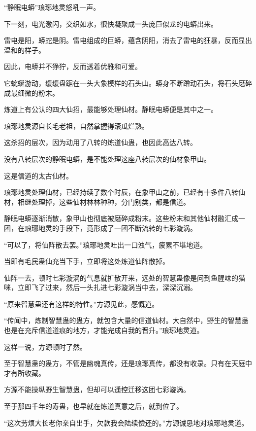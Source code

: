 
\begin{this_body}

“静眠电蟒”琅琊地灵怒吼一声。

下一刻，电光激闪，交织如水，很快凝聚成一头庞巨似龙的电蟒出来。

雷电是阳，蟒蛇是阴。雷电组成的巨蟒，蕴含阴阳，消去了雷电的狂暴，反而显出温和的样子。

因此，电蟒并不狰狞，反而透着优雅和可爱。

它蜿蜒游动，缓缓盘踞在一头大象模样的石头山。蟒身不断蹭动石头，将石头磨碎成最细微的粉末。

炼道上有公认的四大仙招，最能够处理仙材。静眠电蟒便是其中之一。

琅琊地灵源自长毛老祖，自然掌握得滚瓜烂熟。

这杀招的层次，因为动用了八转的炼道仙蛊，也因此高达八转。

没有八转层次的静眠电蟒，是不能处理这座八转层次的仙材象甲山。

这是信道的太古仙材。

琅琊地灵处理仙材，已经持续了数个时辰，在象甲山之前，已经有十多件八转仙材，相继处理掉，这些仙材林林种种，分门别类，都是信道。

静眠电蟒逐渐消散，象甲山也彻底被磨碎成粉末。这些粉末和其他仙材融汇成一团，在琅琊地灵的手段下，竟形成了一团不断流转的七彩漩涡。

“可以了，将仙阵散去罢。”琅琊地灵吐出一口浊气，疲累不堪地道。

当即有毛民蛊仙充当下手，立即将这处炼道仙阵散掉。

仙阵一去，顿时七彩漩涡的气息就扩散开来，远处的智慧蛊像是问到鱼腥味的猫咪，立即飞了过来，然后一头扎进七彩漩涡当中去，深深沉溺。

“原来智慧蛊还有这样的特性。”方源见此，感慨道。

“传闻中，炼制智慧蛊的蛊方，就包含大量的信道仙材。大自然中，野生的智慧蛊也是在充斥信道道痕的地方，才能完成自我的晋升。”琅琊地灵道。

这样一说，方源顿时了然。

至于智慧蛊的蛊方，不管是幽魂真传，还是琅琊真传，都没有收录。只有在天庭中才有所收藏。

方源不能操纵野生智慧蛊，但却可以遥控迁移这团七彩漩涡。

至于那四千年的寿蛊，也早就在炼道真意之后，就到位了。

“这次劳烦大长老你亲自出手，欠款我会陆续偿还的。”方源诚恳地对琅琊地灵道。


\end{this_body}
